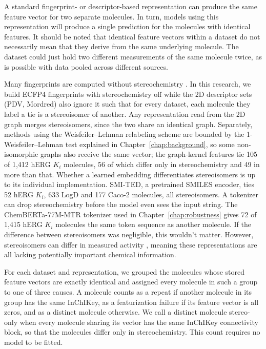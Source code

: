 A standard fingerprint- or descriptor-based representation can produce the same feature vector for two separate molecules. In turn, models using this representation will produce a single prediction for the molecules with identical features. It should be noted that identical feature vectors within a dataset do not necessarily mean that they derive from the same underlying molecule. The dataset could just hold two different measurements of the same molecule twice, as is possible with data pooled across different sources.


Many fingerprints are computed without stereochemistry \citep{orsi2024map4c}. In this research, we build ECFP4 fingerprints with stereochemistry off while the 2D descriptor sets (PDV, Mordred) also ignore it such that for every dataset, each molecule they label a tie is a stereoisomer of another. Any representation read from the 2D graph merges stereoisomers, since the two share an identical graph. Separately, methods using the Weisfeiler--Lehman relabeling scheme are bounded by the 1-Weisfeiler--Lehman test explained in Chapter~\ref{chap:background}, so some non-isomorphic graphs also receive the same vector; the graph-kernel features tie 105 of 1,412 hERG $K_i$ molecules, 56 of which differ only in stereochemistry and 49 in more than that. Whether a learned embedding differentiates stereoisomers is up to its individual implementation. SMI-TED, a pretrained SMILES encoder, ties 52 hERG $K_i$, 633 LogD and 177 Caco-2 molecules, all stereoisomers. A tokenizer can drop stereochemistry before the model even sees the input string. The ChemBERTa-77M-MTR tokenizer used in Chapter~\ref{chap:robustness} gives 72 of 1,415 hERG $K_i$ molecules the same token sequence as another molecule. If the difference between stereoisomers was negligible, this wouldn't matter. However, stereoisomers can differ in measured activity \citep{Nguyen2006}, meaning these representations are all lacking potentially important chemical information.

For each dataset and representation, we grouped the molecules whose stored feature vectors are exactly identical and assigned every molecule in such a group to one of three causes. A molecule counts as a repeat if another molecule in its group has the same InChIKey, as a featurization failure if its feature vector is all zeros, and as a distinct molecule otherwise. We call a distinct molecule stereo-only when every molecule sharing its vector has the same InChIKey connectivity block, so that the molecules differ only in stereochemistry. This count requires no model to be fitted.

